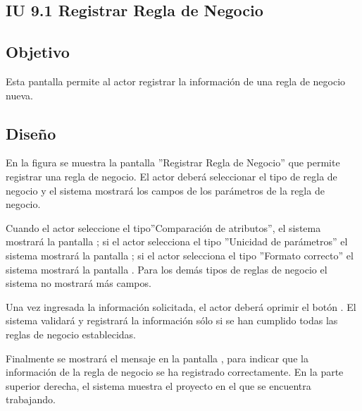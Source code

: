 \subsection{IU 9.1 Registrar Regla de Negocio}

\subsection{Objetivo}
	Esta pantalla permite al actor registrar la información de una regla de negocio nueva.
\subsection{Diseño}
	En la figura  se muestra la pantalla ''Registrar Regla de Negocio'' que permite registrar una regla de negocio. El actor deberá seleccionar el tipo de regla de negocio y el sistema mostrará los campos de los parámetros de la regla de negocio.
	
	Cuando el actor seleccione el tipo''Comparación de atributos'', el sistema mostrará la pantalla ; si el actor selecciona el tipo ''Unicidad de parámetros'' el sistema mostrará la pantalla ; si el actor selecciona el tipo ''Formato correcto'' el sistema mostrará la pantalla . Para los demás tipos de reglas de negocio el sistema no mostrará más campos.
	
	Una vez ingresada la información solicitada, el actor deberá oprimir el botón . El sistema validará y registrará la información sólo si se han cumplido todas las reglas de negocio establecidas.
	
	Finalmente se mostrará el mensaje  en la pantalla , para indicar que la información de la regla de negocio se ha registrado correctamente.
	En la parte superior derecha, el sistema muestra el proyecto en el que se encuentra trabajando.

